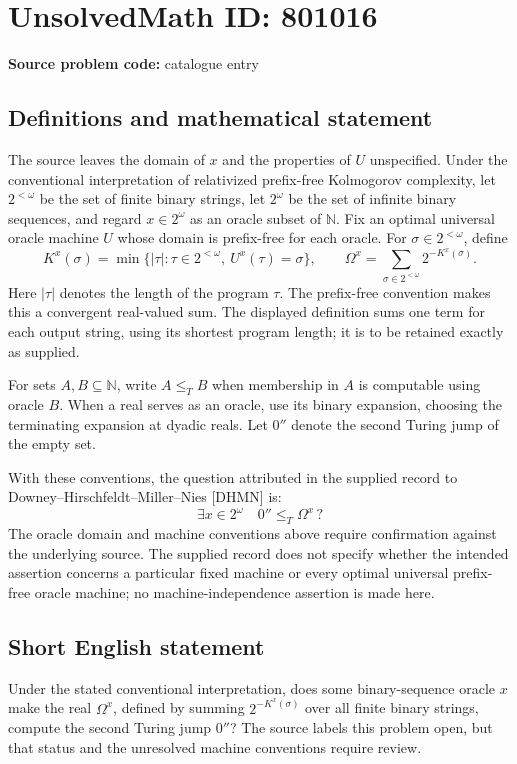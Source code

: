 \documentclass[11pt]{article}
\newcommand{\N}{\mathbb{N}}
\begin{document}
\section*{UnsolvedMath ID: 801016}
\textbf{Source problem code:} catalogue entry
\subsection{Definitions and mathematical statement}
The source leaves the domain of \(x\) and the properties of \(U\) unspecified. Under the conventional interpretation of relativized prefix-free Kolmogorov complexity, let \(2^{<\omega}\) be the set of finite binary strings, let \(2^\omega\) be the set of infinite binary sequences, and regard \(x\in 2^\omega\) as an oracle subset of \(\N\). Fix an optimal universal oracle machine \(U\) whose domain is prefix-free for each oracle. For \(\sigma\in 2^{<\omega}\), define
\[
K^x(\sigma)=\min\{\lvert\tau\rvert:\tau\in 2^{<\omega},\ U^x(\tau)=\sigma\},
\qquad
\Omega^x=\sum_{\sigma\in 2^{<\omega}}2^{-K^x(\sigma)}.
\]
Here \(\lvert\tau\rvert\) denotes the length of the program \(\tau\). The prefix-free convention makes this a convergent real-valued sum. The displayed definition sums one term for each output string, using its shortest program length; it is to be retained exactly as supplied.

For sets \(A,B\subseteq\N\), write \(A\leq_T B\) when membership in \(A\) is computable using oracle \(B\). When a real serves as an oracle, use its binary expansion, choosing the terminating expansion at dyadic reals. Let \(0''\) denote the second Turing jump of the empty set.

With these conventions, the question attributed in the supplied record to Downey--Hirschfeldt--Miller--Nies [DHMN] is:
\[
\exists x\in 2^\omega\quad 0''\leq_T\Omega^x\,?
\]
The oracle domain and machine conventions above require confirmation against the underlying source. The supplied record does not specify whether the intended assertion concerns a particular fixed machine or every optimal universal prefix-free oracle machine; no machine-independence assertion is made here.
\subsection{Short English statement}
Under the stated conventional interpretation, does some binary-sequence oracle \(x\) make the real \(\Omega^x\), defined by summing \(2^{-K^x(\sigma)}\) over all finite binary strings, compute the second Turing jump \(0''\)? The source labels this problem open, but that status and the unresolved machine conventions require review.
\end{document}
